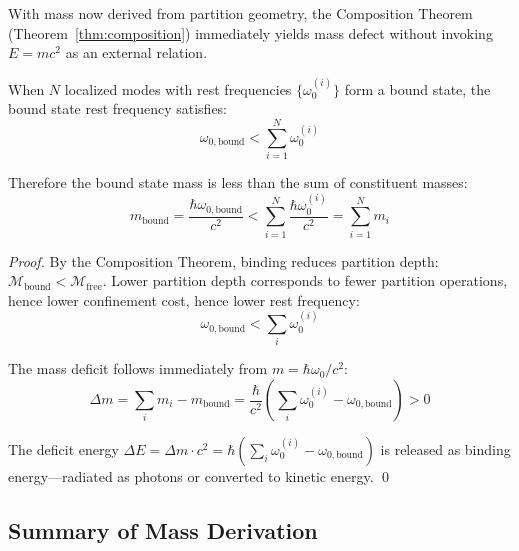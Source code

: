 With mass now derived from partition geometry, the Composition Theorem (Theorem~\ref{thm:composition}) immediately yields mass defect without invoking $E = mc^2$ as an external relation.

\begin{corollary}
\label{cor:mass-defect-derived}
When $N$ localized modes with rest frequencies $\{\omega_0^{(i)}\}$ form a bound state, the bound state rest frequency satisfies:
\begin{equation}
    \omega_{0,\text{bound}} < \sum_{i=1}^N \omega_0^{(i)}
\end{equation}

Therefore the bound state mass is less than the sum of constituent masses:
\begin{equation}
    m_{\text{bound}} = \frac{\hbar\omega_{0,\text{bound}}}{c^2} < \sum_{i=1}^N \frac{\hbar\omega_0^{(i)}}{c^2} = \sum_{i=1}^N m_i
\end{equation}
\end{corollary}

\begin{proof}
By the Composition Theorem, binding reduces partition depth: $\mathcal{M}_{\text{bound}} < \mathcal{M}_{\text{free}}$. Lower partition depth corresponds to fewer partition operations, hence lower confinement cost, hence lower rest frequency:
\begin{equation}
    \omega_{0,\text{bound}} < \sum_i \omega_0^{(i)}
\end{equation}

The mass deficit follows immediately from $m = \hbar\omega_0/c^2$:
\begin{equation}
    \Delta m = \sum_i m_i - m_{\text{bound}} = \frac{\hbar}{c^2}\left(\sum_i \omega_0^{(i)} - \omega_{0,\text{bound}}\right) > 0
\end{equation}

The deficit energy $\Delta E = \Delta m \cdot c^2 = \hbar(\sum_i \omega_0^{(i)} - \omega_{0,\text{bound}})$ is released as binding energy---radiated as photons or converted to kinetic energy. \qed
\end{proof}

\subsection{Summary of Mass Derivation}

